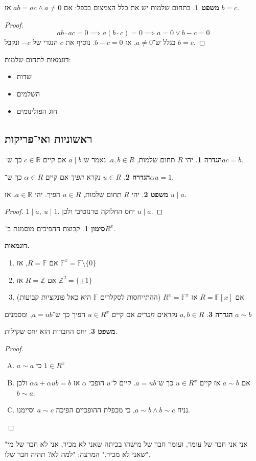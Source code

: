 \documentclass[a4paper]{article}
\newcommand\Z     {\mathbb{Z}}
\newcommand\R     {\mathbb{R}}
\newcommand\F         {\mathbb{F}}
\newcommand\ag        {\alpha}
\theoremstyle{definition}
\newtheorem{Theorem}{משפט}
\newtheorem{definition}{הגדרה}
\newtheorem{Notion}{סימון}
\newcommand\theo  [1] {\begin{Theorem}#1\end{Theorem}}
\newcommand\defi  [1] {\begin{definition}#1\end{definition}}
\newcommand\noti  [1] {\begin{Notion}#1\end{Notion}}
\begin{document}
	\theo{בתחום שלמות יש את כלל הצמצום בכפל: אם $ab = ac \land a \neq 0$ אז $b = c$. }\begin{proof}
		\[ ab  \cdot ac = 0 \implies a(b \cdot c) = 0 \implies a = 0 \lor b - c = 0 \]
		בגלל ש־$a \neq 0$, אז $b - c = 0$. נוסיף את $c$ הנגדי של $-c$ ונקבל $b = c$. 
	\end{proof}
	
	דוגמאות לתחום שלמות: 
	\begin{itemize}
		\item שדות
		\item השלמים
		\item חוג הפולינומים
	\end{itemize}
	
	\subsection{ראשוניות ואי־פריקות}
	\defi{יהי $R$ תחום שלמות, $a, b \in R$. נאמר ש־$a \mid b$ אם קיים $c \in \R$ כך ש־$ac = b$. }
	\defi{$u \in R$ נקרא \textit{הפיך} אם קיים $\ag \in R$ כך ש־$\ag u = 1$. }
	\theo{יהי $R$ תחום שלמות, $u \in R$ הפיך. יהי $a \in \R$. אז $u \mid a$. }\begin{proof}
		$1 \mid a, \ u \mid 1$. יחס החלוקה טרנזטיבי ולכן $u \mid a$. 
	\end{proof}
	\noti{קבוצת ההפיכים מוסמנת ב־$R^x$. }
	\textbf{דוגמאות. }
	\begin{enumerate}
		\item אם $R = \F$, אז $\F^x = \F \setminus \{0\}$
		\item אם $R = \Z$ אז $\Z^2 = \{\pm 1\}$
		\item אם $R = \F[x]$ אז $R^x = \F^x$ (ההתייחסות לסקלרים $\F$ היא כאל פונקציות קבועות)
	\end{enumerate}
	\defi{$a, b \in R$ נקראים \textit{חברים} אם קיים $u \in R^x$ הפיך כך ש־$a = ub$, ומסמנים $a \sim b$ }
	
	\theo{יחס החברות הוא יחס שקילות. }
	\begin{proof}\,
		\begin{enumerate}[A.]
			\item $a \sim a$ כי $1 \in R^x$
			\item אם $a \sim b$ אז קיים $u \in R^x$ כך ש־$a = ub$. קיים ל־$u$ הופכי $\ag$ אז $\ag a + \ag u b = b$ ולכן $b \sim a$. 
			\item נניח $a \sim b \land b \sim c$, כי מכפלת ההופכיים הפיכה $a \sim c$ וסיימנו. 
		\end{enumerate}
	\end{proof}
	"אני אני חבר של עומר, ועומר חבר של מישהו בכיתה שאני לא מכיר, אני לא חבר של מי שאני לא מכיר." המרצה: "למה לא? תהיה חבר שלו". 
	
\end{document}

